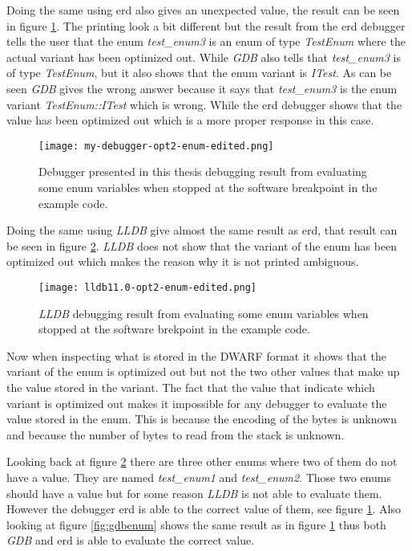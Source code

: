 Doing the same using \gls{erd} also gives an unexpected value, the result can be seen in  figure \ref{fig:mydebuggerenum}.
The printing look a bit different but the result from the \gls{erd} debugger tells the user that the enum \emph{test\_enum3} is an enum of type \emph{TestEnum} where the actual variant has been optimized out.
While \emph{GDB} also tells that \emph{test\_enum3} is of type \emph{TestEnum}, but it also shows that the enum variant is \emph{ITest}.
As can be seen \emph{GDB} gives the wrong answer because it says that \emph{test\_enum3} is the enum variant \emph{TestEnum::ITest} which is wrong.
While the \gls{erd} debugger shows that the value has been optimized out which is a more proper response in this case.


\begin{figure}[h]
	\centering
	\texttt{[image: my-debugger-opt2-enum-edited.png]}
	\caption{Debugger presented in this thesis debugging result from evaluating some enum variables when stopped at the software breakpoint in the example code.}
	\label{fig:mydebuggerenum}
\end{figure}


Doing the same using \emph{LLDB} give almost the same result as \gls{erd}, that result can be seen in figure \ref{fig:lldbenum}.
\emph{LLDB} does not show that the variant of the enum has been optimized out which makes the reason why it is not printed ambiguous.


\begin{figure}[h]
	\centering
	\texttt{[image: lldb11.0-opt2-enum-edited.png]}
	\caption{\emph{LLDB} debugging result from evaluating some enum variables when stopped at the software brekpoint in the example code.}
	\label{fig:lldbenum}
\end{figure}


Now when inspecting what is stored in the \gls{DWARF} format it shows that the variant of the enum is optimized out but not the two other values that make up the value stored in the variant.
The fact that the value that indicate which variant is optimized out makes it impossible for any debugger to evaluate the value stored in the enum.
This is because the encoding of the bytes is unknown and because the number of bytes to read from the stack is unknown.


Looking back at figure \ref{fig:lldbenum} there are three other enums where two of them do not have a value.
They are named \emph{test\_enum1} and \emph{test\_enum2}.
Those two enums should have a value but for some reason \emph{LLDB} is not able to evaluate them.
However the debugger \gls{erd} is able to the correct value of them, see figure \ref{fig:mydebuggerenum}.
Also looking at figure \ref{fig:gdbenum} shows the same result as in figure \ref{fig:mydebuggerenum} thus both \emph{GDB} and \gls{erd} is able to evaluate the correct value.


